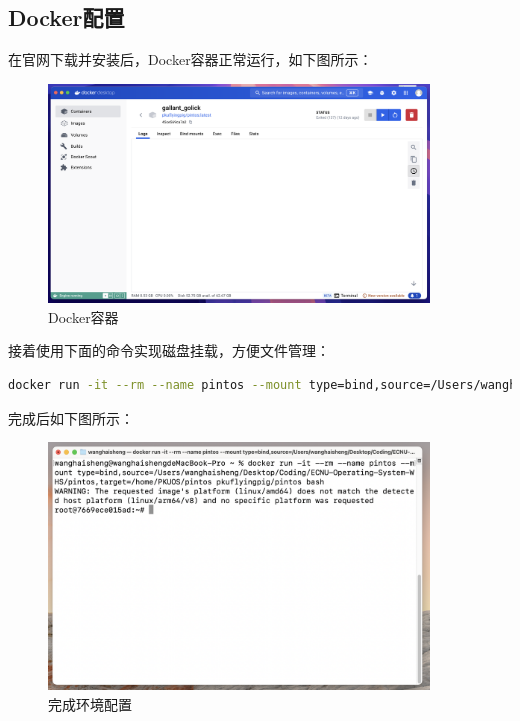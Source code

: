 \documentclass{article}
\begin{document}
\subsection{Docker配置}

在官网下载并安装后，Docker容器正常运行，如下图所示：

\begin{figure}[H]
	\centering
	\includegraphics[width=0.9\textwidth]{img/docker_install.png}
	\caption{Docker容器}
\end{figure}

接着使用下面的命令实现磁盘挂载，方便文件管理：

\begin{lstlisting}[language=Bash, title=启动Docker容器并挂载文件]
	docker run -it --rm --name pintos --mount type=bind,source=/Users/wanghaisheng/Desktop/Coding/Courses/ECNU-Operating-System-WHS/pintos,target=/home/PKUOS/pintos pkuflyingpig/pintos bash
\end{lstlisting}

完成后如下图所示：

\begin{figure}[H]
	\centering
	\includegraphics[width=0.9\textwidth]{img/run_docker.png}
	\caption{完成环境配置}
\end{figure}
\end{document}
